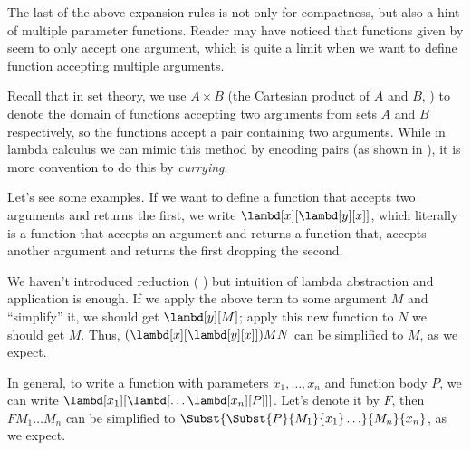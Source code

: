 \documentclass[../../../include/open-logic-section]{subfiles}
\begin{document}

The last of the above expansion rules is not only for compactness, but
also a hint of multiple parameter functions. Reader may have noticed
that functions given by  seem to only accept one argument, which
is quite a limit when we want to define function accepting multiple
arguments.

Recall that in set theory, we use $A \times B$ (the Cartesian product
of $A$ and $B$, \olref[sfr][set][pai]) to denote the domain of functions accepting two
arguments from sets $A$ and $B$ respectively, so the functions accept
a pair containing two arguments. While in lambda calculus we can mimic
this method by encoding pairs (as shown in ),
it is more convention to do this by \emph{currying}.

Let's see some examples. If we want to define a function that accepts
two arguments and returns the first, we write
$\lambd[x][\lambd[y][x]]$, which literally is a function that accepts
an argument and returns a function that, accepts another argument and
returns the first dropping the second. 

We haven't introduced reduction ( ) but intuition
of lambda abstraction and application is enough. If we apply the above
term to some argument $M$ and ``simplify'' it, we should get $\lambd[y][M]$; apply this new function to $N$
we should get $M$. Thus, $(\lambd[x][\lambd[y][x]])MN$ can be
simplified to $M$, as we expect.

In general, to write a function with parameters $x_1, \ldots, x_n$
and function body $P$, we can write
$\lambd[x_1][\lambd[\ldots\lambd[x_n][P]]]$. Let's denote it by $F$,
then $FM_1\ldots M_n$ can be simplified to
$\Subst{\Subst{P}{M_1}{x_1}\ldots}{M_n}{x_n}$, as we expect.
\end{document}
